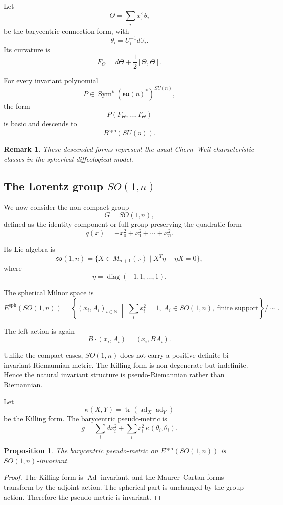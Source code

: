 \documentclass[11pt]{amsart}
\newtheorem{proposition}[theorem]{Proposition}
\newtheorem{remark}[theorem]{Remark}
\begin{document}
Let
\[
\Theta
=
\sum_i x_i^2\,\theta_i
\]
be the barycentric connection form, with
\[
\theta_i=U_i^{-1}dU_i.
\]
Its curvature is
\[
F_\Theta
=
d\Theta+\frac12[\Theta,\Theta].
\]

For every invariant polynomial
\[
P\in \operatorname{Sym}^k(\mathfrak{su}(n)^*)^{SU(n)},
\]
the form
\[
P(F_\Theta,\ldots,F_\Theta)
\]
is basic and descends to
\[
B^{\mathrm{sph}}(SU(n)).
\]

\begin{remark}
These descended forms represent the usual Chern--Weil characteristic classes in the spherical diffeological model.
\end{remark}

\subsection{The Lorentz group \(SO(1,n)\)}

We now consider the non-compact group
\[
G=SO(1,n),
\]
defined as the identity component or full group preserving the quadratic form
\[
q(x)=-x_0^2+x_1^2+\cdots+x_n^2.
\]

Its Lie algebra is
\[
\mathfrak{so}(1,n)
=
\{X\in M_{n+1}(\mathbb R)\mid X^T\eta+\eta X=0\},
\]
where
\[
\eta=\operatorname{diag}(-1,1,\ldots,1).
\]

The spherical Milnor space is
\[
E^{\mathrm{sph}}(SO(1,n))
=
\left\{
(x_i,A_i)_{i\in\mathbb N}
\;\middle|\;
\sum_i x_i^2=1,\ A_i\in SO(1,n),\ \text{finite support}
\right\}/\sim.
\]

The left action is again
\[
B\cdot (x_i,A_i)=(x_i,BA_i).
\]

Unlike the compact cases, \(SO(1,n)\) does not carry a positive definite bi-invariant Riemannian metric. The Killing form is non-degenerate but indefinite. Hence the natural invariant structure is pseudo-Riemannian rather than Riemannian.

Let
\[
\kappa(X,Y)=\operatorname{tr}(\operatorname{ad}_X\operatorname{ad}_Y)
\]
be the Killing form. The barycentric pseudo-metric is
\[
g
=
\sum_i dx_i^2
+
\sum_i x_i^2\,\kappa(\theta_i,\theta_i).
\]

\begin{proposition}
The barycentric pseudo-metric on \(E^{\mathrm{sph}}(SO(1,n))\) is \(SO(1,n)\)-invariant.
\end{proposition}

\begin{proof}
The Killing form is \(\operatorname{Ad}\)-invariant, and the Maurer--Cartan forms transform by the adjoint action. The spherical part is unchanged by the group action. Therefore the pseudo-metric is invariant.
\end{proof}
\end{document}
